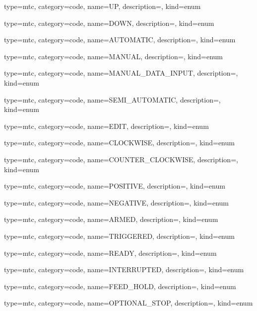 {
  type=mtc,
  category=code,
  name={UP},
  description={},
  kind={enum}
}


{
  type=mtc,
  category=code,
  name={DOWN},
  description={},
  kind={enum}
}


{
  type=mtc,
  category=code,
  name={AUTOMATIC},
  description={},
  kind={enum}
}


{
  type=mtc,
  category=code,
  name={MANUAL},
  description={},
  kind={enum}
}


{
  type=mtc,
  category=code,
  name={MANUAL\_DATA\_INPUT},
  description={},
  kind={enum}
}


{
  type=mtc,
  category=code,
  name={SEMI\_AUTOMATIC},
  description={},
  kind={enum}
}


{
  type=mtc,
  category=code,
  name={EDIT},
  description={},
  kind={enum}
}


{
  type=mtc,
  category=code,
  name={CLOCKWISE},
  description={},
  kind={enum}
}


{
  type=mtc,
  category=code,
  name={COUNTER\_CLOCKWISE},
  description={},
  kind={enum}
}


{
  type=mtc,
  category=code,
  name={POSITIVE},
  description={},
  kind={enum}
}


{
  type=mtc,
  category=code,
  name={NEGATIVE},
  description={},
  kind={enum}
}


{
  type=mtc,
  category=code,
  name={ARMED},
  description={},
  kind={enum}
}


{
  type=mtc,
  category=code,
  name={TRIGGERED},
  description={},
  kind={enum}
}


{
  type=mtc,
  category=code,
  name={READY},
  description={},
  kind={enum}
}


{
  type=mtc,
  category=code,
  name={INTERRUPTED},
  description={},
  kind={enum}
}


{
  type=mtc,
  category=code,
  name={FEED\_HOLD},
  description={},
  kind={enum}
}


{
  type=mtc,
  category=code,
  name={OPTIONAL\_STOP},
  description={},
  kind={enum}
}


